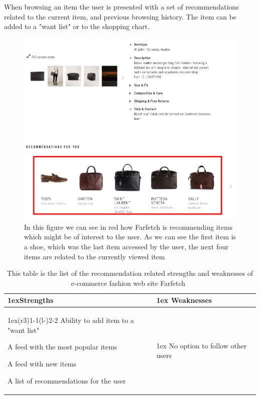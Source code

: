     When browsing an item the user is presented with a set of recommendations related to the current item, and previous browsing history.
    The item can be added to a "want list" or to the shopping chart.
    \begin{figure}[H]
        \centering
        \includegraphics[width=5in]{image/farfetchedRecommendationExample.png}
        \caption[Example of Farfetch's recommendations]{In this figure we can see in red how Farfetch is recommending items which might be of interest to the user. As we can see the first item is a shoe, which was the last item accessed by the user, the next four items are related to the currently viewed item}
        \label{figure:farfetchedRecommendationExample}
    \end{figure}
    \begin{table}[H]
        \centering
        \begin{tabularx}{\linewidth}{>{\parskip1ex}X@{\kern4\tabcolsep}>{\parskip1ex}X}
        	\toprule
        	\hfil\bfseries Strengths
        	&
        	\hfil\bfseries Weaknesses
        		\\\cmidrule(r{3\tabcolsep}){1-1}\cmidrule(l{-\tabcolsep}){2-2}
                Ability to add item to a "want list" \par
                A feed with the most popular items \par
                A feed with new items \par
                A list of recommendations for the user \par
            	&
                No option to follow other users \par
             \\\bottomrule
        \end{tabularx}
        \caption[Recommendation related strengths and weaknesses of Farfetch~\cite{Farfetch}]{This table is the list of the recommendation related strengths and weaknesses of e-commerce fashion web site Farfetch~\cite{Farfetch}}
        \label{table:ecommenreceFarfetch}
    \end{table}


